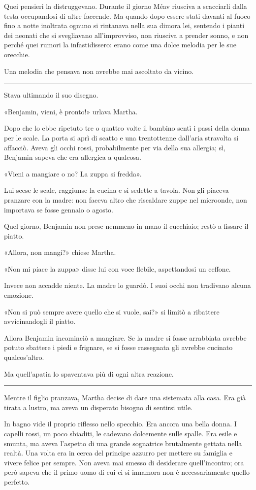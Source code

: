 Quei pensieri la distruggevano. Durante il giorno Méav riusciva a scacciarli dalla testa occupandosi
di altre faccende. Ma quando dopo essere stati davanti al fuoco fino a notte inoltrata ognuno si
rintanava nella sua dimora lei, sentendo i pianti dei neonati che si svegliavano all'improvviso, non
riusciva a prender sonno, e non perché quei rumori la infastidissero: erano come una dolce melodia
per le sue orecchie.

Una melodia che pensava non avrebbe mai ascoltato da vicino.

\plainbreak{1}

Stava ultimando il suo disegno.

«Benjamin, vieni, è pronto!» urlava Martha.

Dopo che lo ebbe ripetuto tre o quattro volte il bambino sentì i passi della donna per le scale. La
porta si aprì di scatto e una trentottenne dall'aria stravolta si affacciò. Aveva gli occhi rossi,
probabilmente per via della sua allergia; sì, Benjamin sapeva che era allergica a qualcosa.

«Vieni a mangiare o no? La zuppa si fredda».

Lui scese le scale, raggiunse la cucina e si sedette a tavola. Non gli piaceva pranzare con la
madre: non faceva altro che riscaldare zuppe nel microonde, non importava se fosse gennaio o agosto.

Quel giorno, Benjamin non prese nemmeno in mano il cucchiaio; restò a fissare il piatto.

«Allora, non mangi?» chiese Martha.

«Non mi piace la zuppa» disse lui con voce flebile, aspettandosi un ceffone.

Invece non accadde niente. La madre lo guardò. I suoi occhi non tradivano alcuna emozione.

«Non si può sempre avere quello che si vuole, sai?» si limitò a ribattere avvicinandogli il piatto.

Allora Benjamin incominciò a mangiare. Se la madre si fosse arrabbiata avrebbe potuto sbattere i
piedi e frignare, se si fosse rassegnata gli avrebbe cucinato qualcos'altro.

Ma quell'apatia lo spaventava più di ogni altra reazione.

\plainbreak{1}

Mentre il figlio pranzava, Martha decise di dare una sistemata alla casa. Era già tirata a lustro,
ma aveva un disperato bisogno di sentirsi utile.

In bagno vide il proprio riflesso nello specchio. Era ancora una bella donna. I capelli rossi, un
poco sbiaditi, le cadevano dolcemente sulle spalle. Era esile e smunta, ma aveva l'aspetto di una
grande sognatrice brutalmente gettata nella realtà. Una volta era in cerca del principe azzurro per
mettere su famiglia e vivere felice per sempre. Non aveva mai smesso di desiderare quell'incontro;
ora però sapeva che il primo uomo di cui ci si innamora non è necessariamente quello perfetto.

